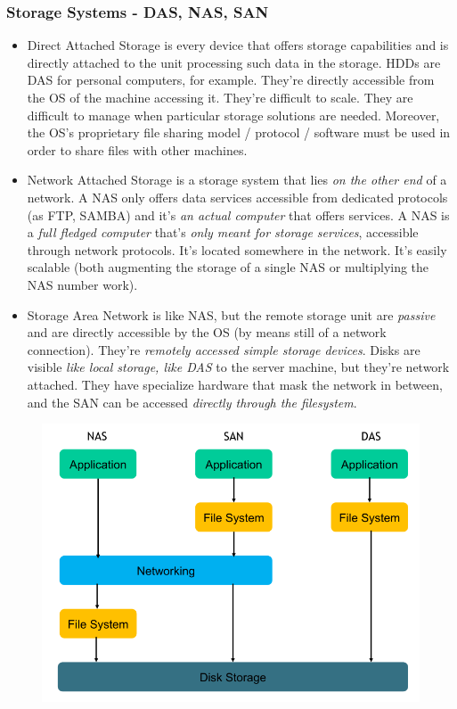 \documentclass{article}
\begin{document}
				\subsubsection{Storage Systems - DAS, NAS, SAN}
					\begin{itemize}
						\item Direct Attached Storage is every device that offers storage capabilities and is directly attached to the unit processing such data in the storage. HDDs are DAS for personal computers, for example. They're directly accessible from the OS of the machine accessing it. They're difficult to scale. They are difficult to manage when particular storage solutions are needed. Moreover, the OS's proprietary file sharing model / protocol / software must be used in order to share files with other machines.
						\item Network Attached Storage is a storage system that lies \emph{on the other end} of a network. A NAS only offers data services accessible from dedicated protocols (as FTP, SAMBA) and it's \emph{an actual computer} that offers services. A NAS is a \emph{full fledged computer} that's \emph{only meant for storage services}, accessible through network protocols. It's located somewhere in the network. It's easily scalable (both augmenting the storage of a single NAS or multiplying the NAS number work).
						\item Storage Area Network is like NAS, but the remote storage unit are \emph{passive} and are directly accessible by the OS (by means still of a network connection). They're \emph{remotely accessed simple storage devices}. Disks are visible \emph{like local storage, like DAS} to the server machine, but they're network attached. They have specialize hardware that mask the network in between, and the SAN can be accessed \emph{directly through the filesystem}. 
					\end{itemize}
					\begin{figure}[H]
						\centering
						\includegraphics[width = \textwidth]{./images/storage.png}
					\end{figure}
					
\end{document}
